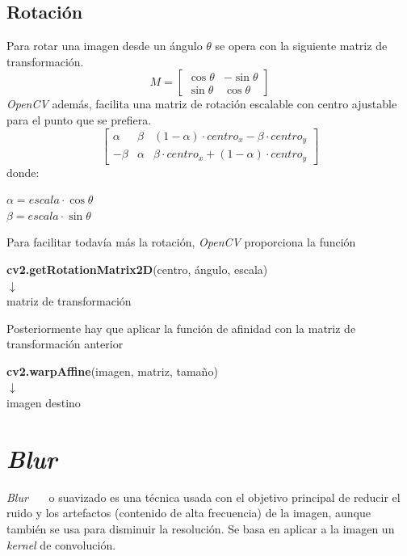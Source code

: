 \subsection{Rotación}
Para rotar una imagen desde un ángulo $\theta$ se opera con la
siguiente matriz de transformación.
\begin{equation*}
  M =
  \begin{bmatrix}
    \cos \theta & -\sin \theta \\ \sin \theta & \cos \theta
  \end{bmatrix}
\end{equation*}
\emph{OpenCV} además, facilita una matriz de rotación escalable con
centro ajustable para el punto que se prefiera.
\begin{equation*}
  \begin{bmatrix}
    \alpha & \beta & (1 - \alpha) \cdot centro_x - \beta \cdot centro_y \\
    - \beta & \alpha & \beta \cdot centro_x + (1 - \alpha) \cdot
    centro_y
  \end{bmatrix}
\end{equation*}
donde:
\begin{center}
  $ \alpha = escala \cdot \cos \theta $
  \\
  $ \beta = escala \cdot \sin \theta $
\end{center}
Para facilitar todavía más la rotación, \emph{OpenCV} proporciona la
función
\begin{center}
  \textbf{cv2.getRotationMatrix2D}(centro, ángulo, escala) \\
  $\downarrow$ \\
  matriz de transformación
\end{center}
Posteriormente hay que aplicar la función de afinidad con la matriz de transformación anterior \\
\begin{center}
  \textbf{cv2.warpAffine}(imagen, matriz, tamaño)\\
  $\downarrow$ \\
  imagen destino
\end{center}

\section{\emph{Blur}}
\emph{Blur}~\emph{\citep*[Smoothing]{opencv_book-bib}}~\emph{\citep*[3.3.1
  Non-linear filtering]{szeliski2010computer}}~\emph{\citep*[4.3 Noise
  Reduction]{toennies2012guide}} o suavizado es una técnica usada con
el objetivo principal de reducir el ruido y los artefactos (contenido
de alta frecuencia) de la imagen, aunque también se usa para disminuir
la resolución. Se basa en aplicar a la imagen un \emph{kernel} de
convolución.
